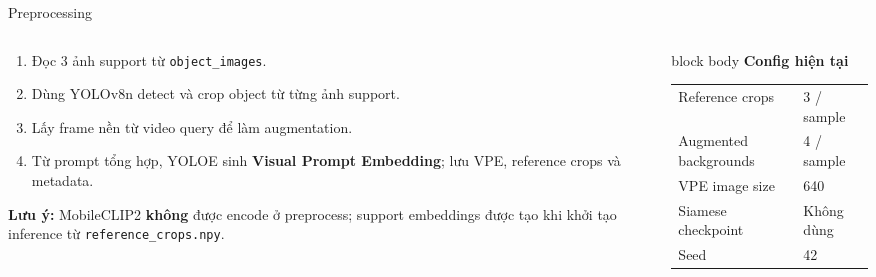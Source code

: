 \documentclass[aspectratio=169]{beamer}
\newcommand{\keyterm}[1]{\textbf{\color{MidBlue}#1}}
\newenvironment{bluebox}[1]{
  \begin{beamercolorbox}[rounded=true,shadow=false,wd=\linewidth,sep=0.28cm]{block body}
  {\bfseries\color{DeepBlue}#1}\par\vspace{0.12cm}
}{
  \end{beamercolorbox}
}
\begin{document}
\begin{frame}{Preprocessing}
  \vspace{0.28cm}
  \begin{columns}[T,onlytextwidth]
    \begin{column}{0.55\textwidth}
      \small
      \begin{enumerate}
        \setlength\itemsep{0.28em}
        \item Đọc 3 ảnh support từ \texttt{object\_images}.
        \item Dùng YOLOv8n detect và crop object từ từng ảnh support.
        \item Lấy frame nền từ video query để làm augmentation.
        \item Từ prompt tổng hợp, YOLOE sinh \keyterm{Visual Prompt Embedding}; lưu VPE, reference crops và metadata.
      \end{enumerate}
      \vspace{0.06cm}
      {\scriptsize\color{DeepBlue}\bfseries Lưu ý:} {\scriptsize MobileCLIP2 \textbf{không} được encode ở preprocess; support embeddings được tạo khi khởi tạo inference từ \texttt{reference\_crops.npy}.}
    \end{column}
    \begin{column}{0.41\textwidth}
      \begin{bluebox}{Config hiện tại}
        \scriptsize
        \begin{tabular}{ll}
          Reference crops & 3 / sample \\
          Augmented backgrounds & 4 / sample \\
          VPE image size & 640 \\
          Siamese checkpoint & Không dùng \\
          Seed & 42 \\
        \end{tabular}
      \end{bluebox}
    \end{column}
  \end{columns}
\end{frame}
\end{document}
